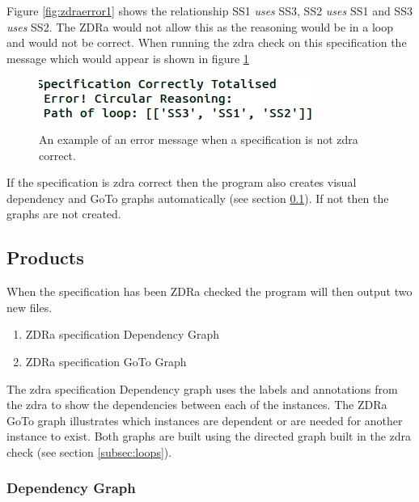 Figure \ref{fig:zdraerror1} shows the relationship SS1 \textit{uses} SS3, SS2 \textit{uses} SS1 and SS3 \textit{uses} SS2. The ZDRa would not allow this as the reasoning would be in a loop and would not be correct. When running the \gls{zdra} check on this specification the message which would appear is shown in figure \ref{fig:zdraerrormess}

\begin{figure}[H]
\centering
\includegraphics[scale=0.4]{Figures/zdra/loopmessage.png}
\caption{An example of an error message when a specification is not \gls{zdra} correct. \label{fig:zdraerrormess}}
\end{figure}

If the specification is \gls{zdra} correct then the program also creates visual dependency and GoTo graphs automatically (see section \ref{subsec:zdra_prodcuts}). If not then the graphs are not created.

\subsection{Products}
\label{subsec:zdra_prodcuts}

When the specification has been ZDRa checked the program will then output two new files.
\begin{enumerate}

\item ZDRa specification Dependency Graph

\item ZDRa specification GoTo Graph
\end{enumerate}

The \gls{zdra} specification Dependency graph uses the labels and annotations from the \gls{zdra} to show the dependencies between each of the instances. The ZDRa GoTo graph illustrates which instances are dependent or are needed for another instance to exist. Both graphs are built using the directed graph built in the \gls{zdra} check (see section \ref{subsec:loops}).

\subsubsection{Dependency Graph}

